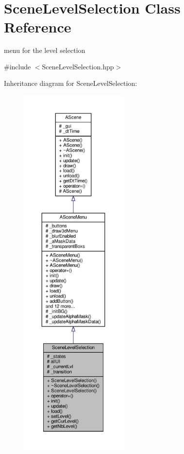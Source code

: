 \hypertarget{class_scene_level_selection}{}\section{Scene\+Level\+Selection Class Reference}
\label{class_scene_level_selection}


menu for the level selection  




{\ttfamily \#include $<$Scene\+Level\+Selection.\+hpp$>$}



Inheritance diagram for Scene\+Level\+Selection\+:
\nopagebreak
\begin{figure}[H]
\begin{center}
\leavevmode
\includegraphics[height=550pt]{class_scene_level_selection__inherit__graph}
\end{center}
\end{figure}


